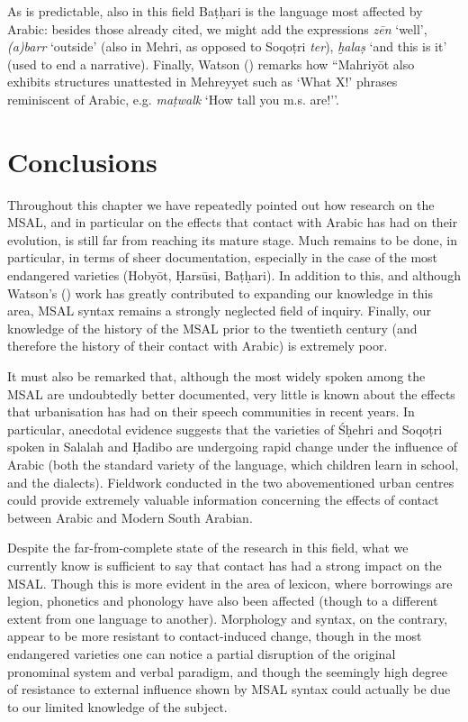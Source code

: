 \documentclass[output=paper]{langsci/langscibook}
\begin{document}
As is predictable, also in this field Baṭḥari is the language most affected by Arabic: besides those already cited, we might add the expressions \textit{zēn} ‘well’, \textit{(a)barr} ‘outside’ (also in Mehri, as opposed to Soqoṭri \textit{ter}), \textit{ḫalaṣ} ‘and this is it’ (used to end a narrative). Finally, Watson (\citeyear[3]{Watson2012}) remarks how ``Mahriyōt also exhibits structures unattested in Mehreyyet such as ‘What X!’ phrases reminiscent of Arabic, e.g. \textit{maṭwalk} ‘How tall you m.s. are!’’.

\section{Conclusions}\label{sec:4}

Throughout this chapter we have repeatedly pointed out how research on the MSAL, and in particular on the effects that contact with Arabic has had on their evolution, is still far from reaching its mature stage. Much remains to be done, in particular, in terms of sheer documentation, especially in the case of the most endangered varieties (Hobyōt, Ḥarsūsi, Baṭḥari). In addition to this, and although Watson’s (\citeyear{Watson2012}) work has greatly contributed to expanding our knowledge in this area, MSAL syntax remains a strongly neglected field of inquiry. Finally, our knowledge of the history of the MSAL prior to the twentieth century (and therefore the history of their contact with Arabic) is extremely poor. 

It must also be remarked that, although the most widely spoken among the MSAL are undoubtedly better documented, very little is known about the effects that urbanisation has had on their speech communities in recent years. In particular, anecdotal evidence suggests that the varieties of Śḥehri and Soqoṭri spoken in Salalah and Ḥadibo are undergoing rapid change under the influence of Arabic (both the standard variety of the language, which children learn in school, and the dialects). Fieldwork conducted in the two abovementioned urban centres could provide extremely valuable information concerning the effects of contact between Arabic and Modern South Arabian.

Despite the far-from-complete state of the research in this field, what we currently know is sufficient to say that contact has had a strong impact on the MSAL. Though this is more evident in the area of lexicon, where borrowings are legion, phonetics and phonology have also been affected (though to a different extent from one language to another). Morphology and syntax, on the contrary, appear to be more resistant to contact-induced change, though in the most endangered varieties one can notice a partial disruption of the original pronominal system and verbal paradigm, and though the seemingly high degree of resistance to external influence shown by MSAL syntax could actually be due to our limited knowledge of the subject.
\end{document}

